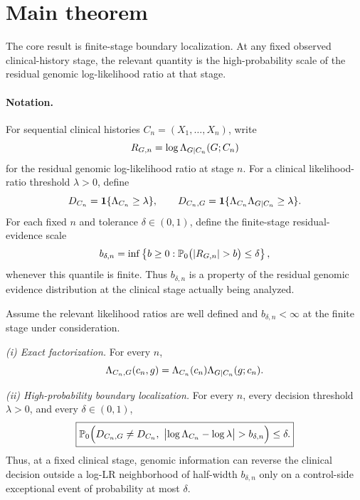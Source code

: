 \section{Main theorem}

The core result is finite-stage boundary localization. At any fixed observed clinical-history stage, the relevant quantity is the high-probability scale of the residual genomic log-likelihood ratio at that stage.

\paragraph*{Notation.} For sequential clinical histories $C_n=(X_1,\ldots,X_n)$, write
\begin{equation}
R_{G,n}=\log \Lambda_{G\mid C_n}(G;C_n)
\end{equation}
for the residual genomic log-likelihood ratio at stage $n$. For a clinical likelihood-ratio threshold $\lambda>0$, define
\begin{equation}
D_{C_n}=\mathbf{1}\{\Lambda_{C_n}\ge \lambda\},\qquad
D_{C_n,G}=\mathbf{1}\{\Lambda_{C_n}\Lambda_{G\mid C_n}\ge \lambda\}.
\end{equation}
For each fixed $n$ and tolerance $\delta\in(0,1)$, define the finite-stage residual-evidence scale
\begin{equation}
b_{\delta,n}
=\inf\left\{b\ge0:\Pzero\bigl(|R_{G,n}|>b\bigr)\le\delta\right\},
\label{eq:finite-stage-bound}
\end{equation}
whenever this quantile is finite. Thus $b_{\delta,n}$ is a property of the residual genomic evidence distribution at the clinical stage actually being analyzed.

\begin{theorem}
\label{thm:main}
Assume the relevant likelihood ratios are well defined and $b_{\delta,n}<\infty$ at the finite stage under consideration.

\emph{(i) Exact factorization.} For every $n$,
\begin{equation}
\Lambda_{C_n,G}(c_n,g)=\Lambda_{C_n}(c_n)\Lambda_{G\mid C_n}(g;c_n).
\end{equation}

\emph{(ii) High-probability boundary localization.} For every $n$, every decision threshold $\lambda>0$, and every $\delta\in(0,1)$,
\begin{equation}
\boxed{
\Pzero\Bigl(
D_{C_n,G}\neq D_{C_n},\
\bigl|\log \LR_{C_n}-\log\lambda\bigr|>b_{\delta,n}
\Bigr)\le \delta.
}
\label{eq:stochastic-band-result}
\end{equation}
Thus, at a fixed clinical stage, genomic information can reverse the clinical decision outside a log-LR neighborhood of half-width $b_{\delta,n}$ only on a control-side exceptional event of probability at most $\delta$.
\end{theorem}

